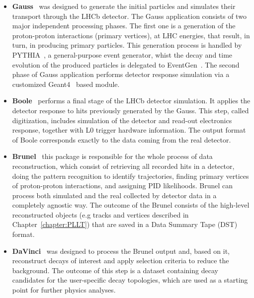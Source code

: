 \begin{itemize}
    \item \textbf{Gauss}~\cite{gauss_lhcb} was designed to generate the initial particles and simulates their transport through the LHCb detector. The Gauss application consists of two major independent processing phases. The first one is a generation of the proton-proton interactions (primary vertices), at LHC energies, that result, in turn, in producing primary particles. This generation process  is handled by PYTHIA~\cite{pythia}, a general-purpose event generator, whist the decay and time evolution of the produced particles is delegated to EventGen~\cite{EventGen}. The second phase of Gauss application performs detector response simulation via a customized Geant4~\cite{geant4} based module. 
    \item \textbf{Boole}~\cite{lhcb_software}  performs a final stage of the LHCb detector simulation. It applies the detector response to hits previously generated by the Gauss. This step, called digitization, includes simulation of the detector and read-out electronics response, together with L0 trigger hardware information. The output format of Boole corresponds exactly to the data coming from the real detector.
    \item \textbf{Brunel}~\cite{lhcb_software} this package is responsible for the whole process of data reconstruction, which consist of retrieving all recorded hits in a detector, doing the pattern recognition to identify trajectories, finding primary vertices of proton-proton interactions, and assigning PID likelihoods. Brunel can process both simulated and the real collected by detector data in a completely agnostic way. The outcome of the Brunel consists of the high-level reconstructed objects (e.g tracks and vertices described in Chapter~\ref{chapter:PLLT}) that are saved in a Data Summary Tape (DST) format.   
    \item  \textbf{DaVinci}~\cite{lhcb_software} was designed to process the Brunel output and, based on it, reconstruct decays of interest and apply selection criteria to reduce the background. The outcome of this step is a dataset containing decay candidates for the user-specific decay topologies, which are used as a starting point for further physics analyses.   
    
\end{itemize}


